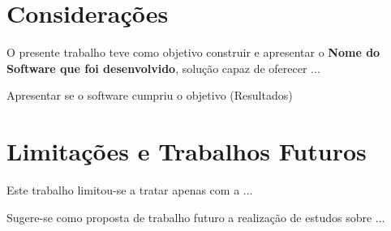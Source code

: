 \label{cap:conclusao}

\section{Considerações}

    O presente trabalho teve como objetivo construir e apresentar o \textbf{Nome do Software que foi desenvolvido}, solução capaz de oferecer ...

    \textbf{ }
    
    Apresentar se o software cumpriu o objetivo (Resultados)

\section{Limitações e Trabalhos Futuros} \textbf{ }

    Este trabalho limitou-se a tratar apenas com a ...

    \textbf{ }
    
    Sugere-se como proposta de trabalho futuro a realização de estudos sobre ...